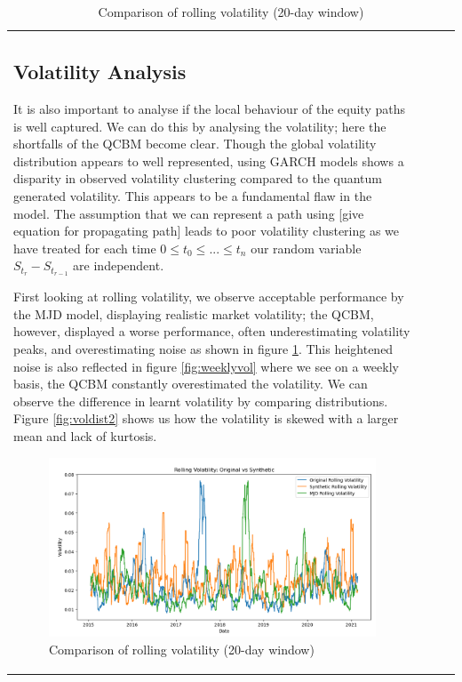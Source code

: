 \documentclass[12pt]{article}
\newcommand{\newp}
    {
    \vskip 0.5cm 
  }
\numberwithin{equation}{section}
\begin{document}
\begin{table}[h!]
\begin{tabular}{|l|c|c|c|}
\subsection{Volatility Analysis}
It is also important to analyse if the local behaviour of the equity paths is well 
captured. We can do this by analysing the volatility; here the shortfalls of the 
QCBM become clear. Though the global volatility distribution appears to well 
represented, using GARCH models shows a disparity in observed volatility clustering 
compared to the quantum generated volatility. This appears to be a fundamental 
flaw in the model. The assumption that we can represent a path using [give 
equation for propagating path] leads to poor volatility clustering as we have 
treated for each time $0\leq t_0 \leq ...\leq t_n$ our random variable 
$S_{t_r}-S_{t_{r-1}}$ are independent.
\newp 
First looking at rolling volatility, we observe acceptable performance by the 
MJD model, displaying realistic market volatility; the QCBM, however, displayed 
a worse performance, often underestimating volatility peaks, and overestimating 
noise as shown in figure \ref{fig:rollingvol}.
This heightened noise is also reflected 
in figure \ref{fig:weeklyvol} where we see on a weekly basis, the QCBM 
constantly overestimated the volatility. We can observe the difference in learnt 
volatility by comparing distributions. Figure \ref{fig:voldist2} shows us how the 
volatility is skewed with a larger mean and lack of kurtosis. 
\begin{figure}[h!]
    \centering
    \begin{minipage}{0.48\textwidth}
        \centering
        \includegraphics[width=\linewidth]{rollingvol.png}
        \caption{Comparison of rolling volatility (20-day window)}
        \label{fig:rollingvol}
    \end{minipage}
    \hfill

\end{figure}
\end{tabular}
\end{table}
\end{document}
